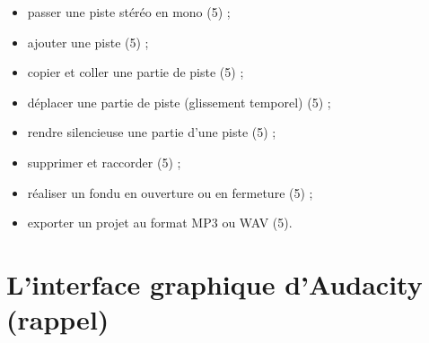 \begin{itemize}
\item passer une piste stéréo en mono (5) ;
\item ajouter une piste (5) ;
\item copier et coller une partie de piste (5) ;
\item déplacer une partie de piste (glissement temporel) (5) ; 
\item rendre silencieuse une partie d'une piste (5) ;
\item supprimer et raccorder (5) ;
\item réaliser un fondu en ouverture ou en fermeture (5) ;
\item exporter un projet au format MP3 ou WAV (5).
\end{itemize}




\section{L'interface graphique d'Audacity (rappel)}


